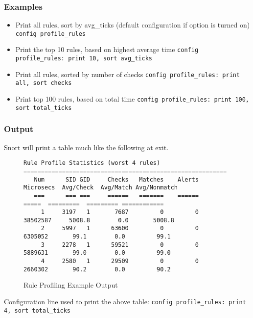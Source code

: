 \documentclass[english]{report}
\begin{document}
\subsubsection{Examples}
\begin{itemize}

\item Print all rules, sort by avg\_ticks (default configuration if option is turned on)
\subitem \texttt{config profile\_rules}

\item Print the top 10 rules, based on highest average time
\subitem \texttt{config profile\_rules: print 10, sort avg\_ticks}

\item Print all rules, sorted by number of checks
\subitem \texttt{config profile\_rules: print all, sort checks}

\item Print top 100 rules, based on total time
\subitem \texttt{config profile\_rules: print 100, sort total\_ticks}

\end{itemize}

\subsubsection{Output}

Snort will print a table much like the following at exit.  
\begin{figure}[!hbpt]
\footnotesize{
\begin{verbatim}
Rule Profile Statistics (worst 4 rules)
==========================================================
   Num      SID GID     Checks   Matches    Alerts           Microsecs  Avg/Check  Avg/Match Avg/Nonmatch
   ===      === ===     ======   =======    ======               =====  =========  ========= ============
     1     3197   1       7687         0         0            38502587     5008.8        0.0       5008.8
     2     5997   1      63600         0         0             6305052       99.1        0.0         99.1
     3     2278   1      59521         0         0             5889631       99.0        0.0         99.0
     4     2580   1      29509         0         0             2660302       90.2        0.0         90.2
\end{verbatim}
}
\caption{\label{rule profiling example output}Rule Profiling Example Output}
\end{figure}

Configuration line used to print the above table: 
\subitem \texttt{config profile\_rules: print 4, sort total\_ticks}
\end{document}
